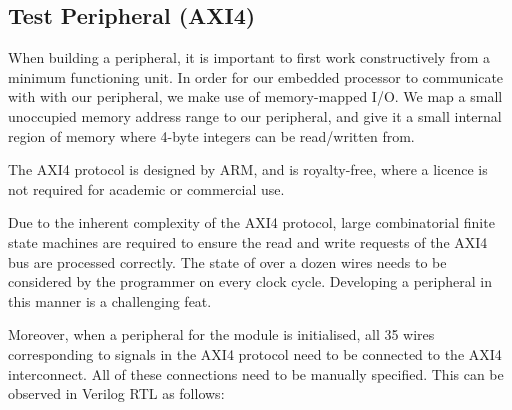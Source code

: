 \documentclass[a4paper,9pt]{report}
\begin{document}

\subsection{Test Peripheral (AXI4)}
When building a peripheral, it is important to first work constructively from a
minimum functioning unit. In order for our embedded processor to communicate
with with our peripheral, we make use of memory-mapped I/O. We map a small
unoccupied memory address range to our peripheral, and give it a small internal
region of memory where 4-byte integers can be read/written from.

The AXI4 protocol is designed by ARM, and is royalty-free, where a licence is
not required for academic or commercial use.




Due to the inherent complexity of the AXI4 protocol, large combinatorial finite
state machines are required to ensure the read and
write requests of the AXI4 bus are processed correctly. The state of over a
dozen wires needs to be considered by the programmer on every clock cycle.
Developing a peripheral in this manner is a challenging feat.

Moreover, when a peripheral for the module is initialised, all 35 wires
corresponding to signals in the AXI4 protocol need to be connected to the AXI4
interconnect. All of these connections need to be manually specified. This can
be observed in Verilog RTL as follows:
\end{document}
